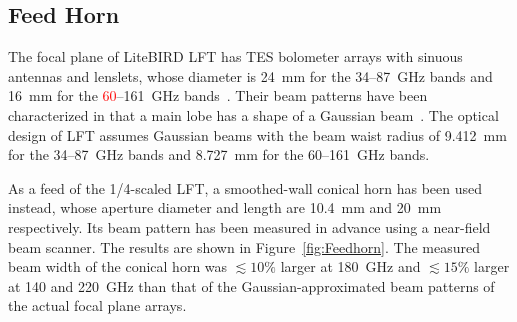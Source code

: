 \documentclass[journal]{IEEEtran}
\newcommand{\red}[1]{\textcolor{red}{#1}}
\begin{document}
\subsection{Feed Horn}
\par
The focal plane of LiteBIRD LFT has TES bolometer arrays with sinuous antennas and lenslets, whose diameter is 24~mm for the 34--87~GHz bands and 16~mm for the \red{60}--161~GHz bands~\cite{Suzuki2018}. 
Their beam patterns have been characterized in that a main lobe has a shape of a Gaussian beam~\cite{Edwards2012}. 
The optical design of LFT assumes Gaussian beams with the beam waist radius of 9.412~mm for the 34--87~GHz bands and 8.727~mm for the 60--161~GHz bands.
\par 
As a feed of the 1/4-scaled LFT, a smoothed-wall conical horn has been used instead, whose aperture diameter and length are 10.4~mm and 20~mm respectively. Its beam pattern has been measured in advance using a near-field beam scanner. The results are shown in Figure~\ref{fig:Feedhorn}. The measured beam width of the conical horn was $\lesssim 10\%$ larger at 180~GHz and $\lesssim 15\%$ larger at 140 and 220~GHz than that of the Gaussian-approximated beam patterns of the actual focal plane arrays.
\end{document}
